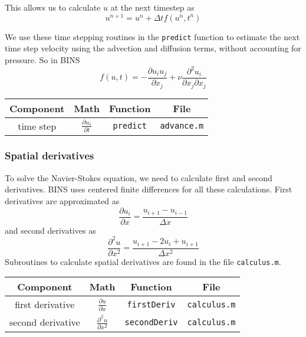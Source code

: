 \documentclass[12pt]{article}
\begin{document}
This allows us to calculate $u$ at the next timestep as
\begin{equation}
u^{n+1} = u^n + \Delta t f(u^n,t^n)
\end{equation}

We use these time stepping routines in the \texttt{predict} function to estimate the next time step velocity using the advection and diffusion terms, without accounting for pressure.  So in BINS
\[ f(u,t) = -\frac{\partial u_i u_j}{\partial x_j} + \nu \frac{\partial^2 u_i}{\partial x_j \partial x_j} \]

\begin{center}
\begin{tabular}{|c|c|c|c|}
\hline 
\bf{Component} & \bf{Math} & \bf{Function} & \bf{File}\\ 
\hline 
time step & $\frac{\partial u_i}{\partial t}$ & \texttt{predict}& \texttt{advance.m} \\ 
\hline 
\end{tabular} 
\end{center}

\subsubsection{Spatial derivatives}
To solve the Navier-Stokes equation, we need to calculate first and second derivatives.  BINS uses centered finite differences for all these calculations.  First derivatives are approximated as
\begin{equation}
\frac{\partial u_i}{\partial x} = \frac{u_{i+1} - u_{i-1}}{\Delta x}
\end{equation}
and second derivatives as
\begin{equation}
\frac{\partial^2 u}{\partial x^2} = \frac{u_{i+1} -2 u_i + u_{i+1}}{\Delta x^2}
\end{equation}
Subroutines to calculate spatial derivatives are found in the file \texttt{calculus.m}.

\begin{center}
\begin{tabular}{|c|c|c|c|}
\hline 
\bf{Component} & \bf{Math} & \bf{Function} & \bf{File}\\ 
\hline 
first derivative & $\frac{\partial u}{\partial x}$ & \texttt{firstDeriv} & \texttt{calculus.m}\\ 
\hline 
second derivative & $\frac{\partial^2 u}{\partial x^2}$ & \texttt{secondDeriv} & \texttt{calculus.m}\\ 
\hline 
\end{tabular} 
\end{center}
\end{document}
